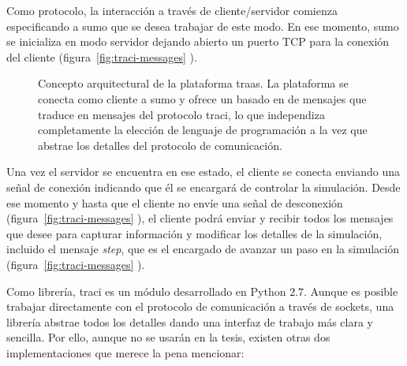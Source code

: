 Como protocolo, la interacción a través de cliente/servidor comienza especificando a \gls{sumo} que se desea trabajar de este modo. En ese momento, \gls{sumo} se inicializa en modo servidor dejando abierto un puerto TCP para la conexión del cliente (figura~\ref{fig:traci-messages} ).

\begin{figure}[t]
	\centering
	\caption[Arquitectura de la plataforma \gls{traas}]{Concepto arquitectural de la plataforma \gls{traas}. La plataforma se conecta como cliente a \gls{sumo} y ofrece un  basado en  de mensajes que traduce en mensajes del protocolo \gls{traci}, lo que independiza completamente la elección de lenguaje de programación a la vez que abstrae los detalles del protocolo de comunicación.}
	\label{fig:traas}
\end{figure}

Una vez el servidor se encuentra en ese estado, el cliente se conecta enviando una señal de conexión indicando que él se encargará de controlar la simulación. Desde ese momento y hasta que el cliente no envíe una señal de desconexión (figura~\ref{fig:traci-messages} ), el cliente podrá enviar y recibir todos los mensajes que desee para capturar información y modificar los detalles de la simulación, incluido el mensaje \textit{step}, que es el encargado de avanzar un paso en la simulación (figura~\ref{fig:traci-messages} ).

Como librería, \gls{traci} es un módulo desarrollado en \mbox{Python} $2$.$7$. Aunque es posible trabajar directamente con el protocolo de comunicación a través de sockets, una librería abstrae todos los detalles dando una interfaz de trabajo más clara y sencilla. Por ello, aunque no se usarán en la tesis, existen otras dos implementaciones que merece la pena mencionar:

